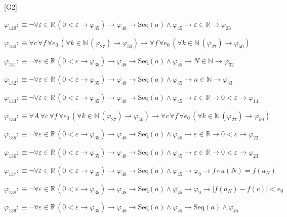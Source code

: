 \begin{fullproof}{[G2]}
\begin{abbrevlist}
\item $\varphi_{129} :\equiv \neg \forall \varepsilon \in \mathbb{R}\,(0 < \varepsilon \to \varphi_{35}) \to \varphi_{48} \to \mathrm{Seq}(a) \land \varphi_{45} \to \varepsilon \in \mathbb{R} \to \varphi_{26}$
\item $\varphi_{130} :\equiv \forall c\,\forall f\,\forall e_{0}\,(\forall k \in \mathbb{N}\,(\varphi_{27}) \to \varphi_{50}) \to \forall f\,\forall e_{0}\,(\forall k \in \mathbb{N}\,(\varphi_{27}) \to \varphi_{50})$
\item $\varphi_{131} :\equiv \neg \forall \varepsilon \in \mathbb{R}\,(0 < \varepsilon \to \varphi_{35}) \to \varphi_{48} \to \mathrm{Seq}(a) \land \varphi_{45} \to N \in \mathbb{N} \to \varphi_{32}$
\item $\varphi_{132} :\equiv \neg \forall \varepsilon \in \mathbb{R}\,(0 < \varepsilon \to \varphi_{35}) \to \varphi_{48} \to \mathrm{Seq}(a) \land \varphi_{45} \to n \in \mathbb{N} \to \varphi_{33}$
\item $\varphi_{133} :\equiv \neg \forall \varepsilon \in \mathbb{R}\,(0 < \varepsilon \to \varphi_{35}) \to \varphi_{48} \to \mathrm{Seq}(a) \land \varphi_{45} \to \varepsilon \in \mathbb{R} \to 0 < \varepsilon \to \varphi_{14}$
\item $\varphi_{134} :\equiv \forall A\,\forall c\,\forall f\,\forall e_{0}\,(\forall k \in \mathbb{N}\,(\varphi_{27}) \to \varphi_{50}) \to \forall c\,\forall f\,\forall e_{0}\,(\forall k \in \mathbb{N}\,(\varphi_{27}) \to \varphi_{50})$
\item $\varphi_{135} :\equiv \neg \forall \varepsilon \in \mathbb{R}\,(0 < \varepsilon \to \varphi_{35}) \to \varphi_{48} \to \mathrm{Seq}(a) \land \varphi_{45} \to \varepsilon \in \mathbb{R} \to 0 < \varepsilon \to \varphi_{22}$
\item $\varphi_{136} :\equiv \neg \forall \varepsilon \in \mathbb{R}\,(0 < \varepsilon \to \varphi_{35}) \to \varphi_{48} \to \mathrm{Seq}(a) \land \varphi_{45} \to \varepsilon \in \mathbb{R} \to 0 < \varepsilon \to \varphi_{23}$
\item $\varphi_{137} :\equiv \neg \forall \varepsilon \in \mathbb{R}\,(0 < \varepsilon \to \varphi_{35}) \to \varphi_{48} \to \mathrm{Seq}(a) \land \varphi_{45} \to \varphi_{9} \to f \circ a(N) = f(a_{N})$
\item $\varphi_{138} :\equiv \neg \forall \varepsilon \in \mathbb{R}\,(0 < \varepsilon \to \varphi_{35}) \to \varphi_{48} \to \mathrm{Seq}(a) \land \varphi_{45} \to \varphi_{9} \to \lvert f(a_{N}) - f(c) \rvert < e_{0}$
\item $\varphi_{139} :\equiv \neg \forall \varepsilon \in \mathbb{R}\,(0 < \varepsilon \to \varphi_{35}) \to \varphi_{48} \to \mathrm{Seq}(a) \land \varphi_{45} \to \mathrm{Seq}(a) \land \varphi_{45}$

\end{abbrevlist}
\end{fullproof}
